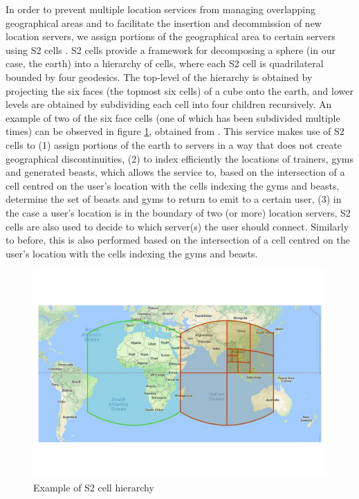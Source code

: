 In order to prevent multiple location services from managing overlapping geographical areas and to facilitate the insertion and decommission of new location servers, we assign portions of the geographical area to certain servers using S2 cells . S2 cells provide a framework for decomposing a sphere (in our case, the earth) into a hierarchy of cells, where each S2 cell is quadrilateral bounded by four geodesics. The top-level of the hierarchy is obtained by projecting the six faces (the topmost six cells) of a cube onto the earth, and lower levels are obtained by subdividing each cell into four children recursively. An example of two of the six face cells (one of which has been subdivided multiple times) can be observed in figure \ref{fig:pouchbeasts-s2cells}, obtained from . This service makes use of S2 cells to (1) assign portions of the earth to servers in a way that does not create geographical discontinuities, (2) to index efficiently the locations of trainers, gyms and generated beasts, which allows the service to, based on the intersection of a cell centred on the user's location with the cells indexing the gyms and beasts, determine the set of beasts and gyms to return to emit to a certain user, (3) in the case a user's location is in the boundary of two (or more) location servers, S2 cells are also used to decide to which server(s) the user should connect. Similarly to before, this is also performed based on the intersection of a cell centred on the user's location with the cells indexing the gyms and beasts.

\begin{figure}[htbp]
    \centering
    \includegraphics[width=\textwidth]{Chapters/benchmark/figures/s2_cells.pdf}
    \caption{Example of S2 cell hierarchy}
    \label{fig:pouchbeasts-s2cells}
\end{figure}

